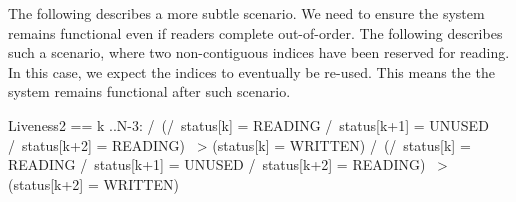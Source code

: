The following describes a more subtle scenario. We need to ensure the system
remains functional even if readers complete out-of-order. The following describes such a scenario, where two non-contiguous indices have been reserved for reading.
In this case, we expect the indices to eventually be re-used. This means the
the system remains functional after such scenario.\newline

\begin{tla}
Liveness2 == 
    \A k ..N-3:
    /\ (/\ status[k] = READING 
        /\ status[k+1] = UNUSED 
        /\ status[k+2] = READING)
        ~> (status[k] = WRITTEN)
    /\ (/\ status[k] = READING 
        /\ status[k+1] = UNUSED 
        /\ status[k+2] = READING)
        ~> (status[k+2] = WRITTEN)
\end{tla}
\begin{tlatex}
%
%
%
%
%
%
%
%
%
%
\end{tlatex}

% 
